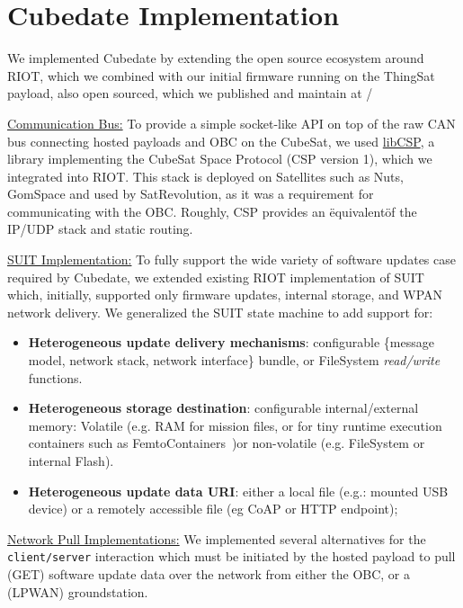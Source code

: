 \section{Cubedate Implementation}
\label{sec:implementation}

We implemented Cubedate by extending the open source ecosystem around RIOT, which we combined with
our initial firmware running on the ThingSat payload, also open sourced, which we published and
maintain at \cite*{git:cubedate-repo}/

\underline{Communication Bus:}
To provide a simple socket-like API on top of the raw CAN bus connecting hosted
payloads and OBC on the CubeSat, we used \href{https://github.com/libcsp/libcsp}{libCSP},
a library implementing the CubeSat Space Protocol (CSP version 1), which we integrated into RIOT.
This stack is deployed on Satellites such as Nuts\cite{birkeland2014nutsoverview}, GomSpace
and used by SatRevolution, as it was a requirement for communicating with the OBC.
Roughly, CSP provides an \"equivalent\" of the IP/UDP stack and static routing.

\underline{SUIT Implementation:}
To fully support the wide variety of software updates case required by Cubedate, we
extended existing RIOT implementation of SUIT~\cite{zandberg2019secure} which,
initially, supported only firmware updates, internal storage, and WPAN network delivery.
We generalized the SUIT state machine to add support for:

\begin{itemize}
    \item \textbf{Heterogeneous update delivery mechanisms}: configurable \{message model,
    network stack, network interface\} bundle, or FileSystem \textit{read/write} functions.
    \item \textbf{Heterogeneous storage destination}: configurable internal/external memory:
    Volatile (e.g. RAM for mission files, or for tiny runtime execution containers such as
    FemtoContainers~\cite{zandberg2021femto})or non-volatile (e.g. FileSystem or internal Flash).
    \item \textbf{Heterogeneous update data URI}: either a local file (e.g.: mounted USB device)
    or a remotely accessible file (eg CoAP or HTTP endpoint);
\end{itemize}

\underline{Network Pull Implementations:}
We implemented several alternatives for the \texttt{client/server} interaction which
must be initiated by the hosted payload to pull (GET) software update data over the
network from either the OBC, or a (LPWAN) groundstation.

